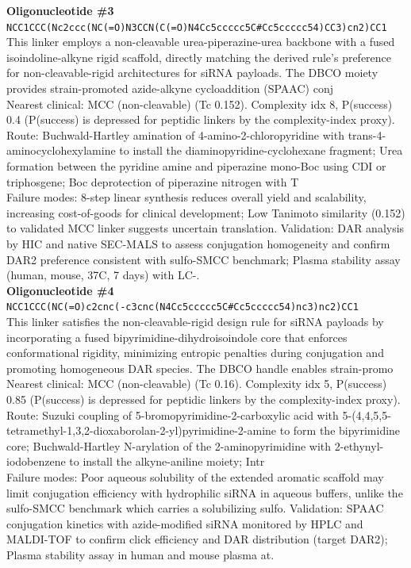\documentclass[10pt]{article}
\begin{document}
\noindent\textbf{Oligonucleotide \#3} \\ \texttt{NCC1CCC(Nc2ccc(NC(=O)N3CCN(C(=O)N4Cc5ccccc5C\#Cc5ccccc54)CC3)cn2)CC1} \\ This linker employs a non-cleavable urea-piperazine-urea backbone with a fused isoindoline-alkyne rigid scaffold, directly matching the derived rule's preference for non-cleavable-rigid architectures for siRNA payloads. The DBCO moiety provides strain-promoted azide-alkyne cycloaddition (SPAAC) conj \\ Nearest clinical: MCC (non-cleavable) (Tc 0.152). Complexity idx 8, P(success) 0.4 (P(success) is depressed for peptidic linkers by the complexity-index proxy). \\ Route: Buchwald-Hartley amination of 4-amino-2-chloropyridine with trans-4-aminocyclohexylamine to install the diaminopyridine-cyclohexane fragment; Urea formation between the pyridine amine and piperazine mono-Boc using CDI or triphosgene; Boc deprotection of piperazine nitrogen with T \\ Failure modes: 8-step linear synthesis reduces overall yield and scalability, increasing cost-of-goods for clinical development; Low Tanimoto similarity (0.152) to validated MCC linker suggests uncertain translation. Validation: DAR analysis by HIC and native SEC-MALS to assess conjugation homogeneity and confirm DAR2 preference consistent with sulfo-SMCC benchmark; Plasma stability assay (human, mouse, 37\textdegree{}C, 7 days) with LC-. \\[0.4em]
\noindent\textbf{Oligonucleotide \#4} \\ \texttt{NCC1CCC(NC(=O)c2cnc(-c3cnc(N4Cc5ccccc5C\#Cc5ccccc54)nc3)nc2)CC1} \\ This linker satisfies the non-cleavable-rigid design rule for siRNA payloads by incorporating a fused bipyrimidine-dihydroisoindole core that enforces conformational rigidity, minimizing entropic penalties during conjugation and promoting homogeneous DAR species. The DBCO handle enables strain-promo \\ Nearest clinical: MCC (non-cleavable) (Tc 0.16). Complexity idx 5, P(success) 0.85 (P(success) is depressed for peptidic linkers by the complexity-index proxy). \\ Route: Suzuki coupling of 5-bromopyrimidine-2-carboxylic acid with 5-(4,4,5,5-tetramethyl-1,3,2-dioxaborolan-2-yl)pyrimidine-2-amine to form the bipyrimidine core; Buchwald-Hartley N-arylation of the 2-aminopyrimidine with 2-ethynyl-iodobenzene to install the alkyne-aniline moiety; Intr \\ Failure modes: Poor aqueous solubility of the extended aromatic scaffold may limit conjugation efficiency with hydrophilic siRNA in aqueous buffers, unlike the sulfo-SMCC benchmark which carries a solubilizing sulfo. Validation: SPAAC conjugation kinetics with azide-modified siRNA monitored by HPLC and MALDI-TOF to confirm click efficiency and DAR distribution (target DAR2); Plasma stability assay in human and mouse plasma at. \\[0.4em]
\end{document}
